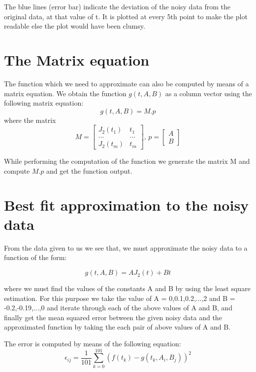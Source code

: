 \documentclass[11pt, a4paper]{article}
\begin{document}
The blue lines (error bar) indicate the deviation of the noisy data from the original data, at that value of t. It is plotted at every 5th point to make the plot readable else the plot would have been clumsy.

\section{The Matrix equation}
The function which we need to approximate can also be computed by means of a matrix equation. We obtain the function $g(t,A,B)$ as a column vector using the following matrix equation:
\begin{equation}\label{eq:3}
    g(t,A,B) = M.p
\end{equation}
where the matrix
\begin{equation}
M=\left[\begin{matrix}
J_2(t_1)&t_1\\
...&...\\
J_2(t_m)&t_m
\end{matrix}\right]\text{, }
p=\left[\begin{matrix}
A\\B
\end{matrix}\right]
\end{equation}

While performing the computation of the function we generate the matrix M and compute $M.p$ and get the function output.

\section{Best fit approximation to the noisy data}

From the data given to us we see that, we must approximate the noisy data to a function of the form:

\begin{equation}\label{eq:4}
    g(t, A, B) = AJ_2(t)+Bt
\end{equation}

where we must find the values of the constants A and B by using the least square estimation. For this purpose we take the value of A = 0,0.1,0.2,...,2 and B = -0.2,-0.19,...,0 and iterate through each of the above values of A and B, and finally get the mean squared error between the given noisy data and the approximated function by taking the each pair of above values of A and B. 
\newline

The error is computed by means of the following equation:
\begin{equation}\label{eq:5}
    \epsilon_{ij} = \frac{1}{101}\sum_{k=0}^{101}(f(t_k) - g(t_k, A_i, B_j))^2
\end{equation}
\end{document}
